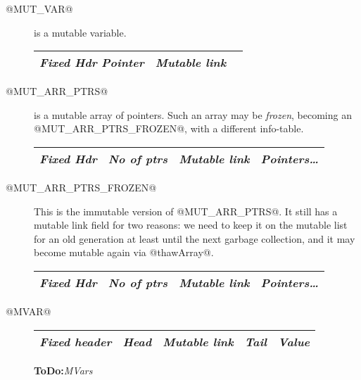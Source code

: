 \documentclass[11pt]{article}
\newcommand{\ToDo}[1]{{{\bf ToDo:}\sl #1}}
\begin{document}
\begin{description}

\item[@MUT\_VAR@] is a mutable variable.
\begin{center}
\begin{tabular}{|c|c|c|}
\hline
\emph{Fixed Hdr} \emph{Pointer} & \emph{Mutable link} & \\ \hline
\end{tabular}
\end{center}

\item[@MUT\_ARR\_PTRS@] is a mutable array of pointers.  Such an array
may be \emph{frozen}, becoming an @MUT_ARR_PTRS_FROZEN@, with a
different info-table.

\begin{center}
\begin{tabular}{|c|c|c|c|}
\hline
\emph{Fixed Hdr} & \emph{No of ptrs} & \emph{Mutable link} & \emph{Pointers\ldots} \\ \hline
\end{tabular}
\end{center}

\item[@MUT\_ARR\_PTRS\_FROZEN@] This is the immutable version of
@MUT_ARR_PTRS@.  It still has a mutable link field for two reasons: we
need to keep it on the mutable list for an old generation at least
until the next garbage collection, and it may become mutable again via
@thawArray@.

\begin{center}
\begin{tabular}{|c|c|c|c|}
\hline
\emph{Fixed Hdr} & \emph{No of ptrs} & \emph{Mutable link} & \emph{Pointers\ldots} \\ \hline
\end{tabular}
\end{center}

\item[@MVAR@]

\begin{center}
\begin{tabular}{|l|l|l|l|l|}
\hline 
\emph{Fixed header} & \emph{Head} & \emph{Mutable link} & \emph{Tail}
& \emph{Value}\\
\hline
\end{tabular}
\end{center}

\ToDo{MVars}

\end{description}
\end{document}
